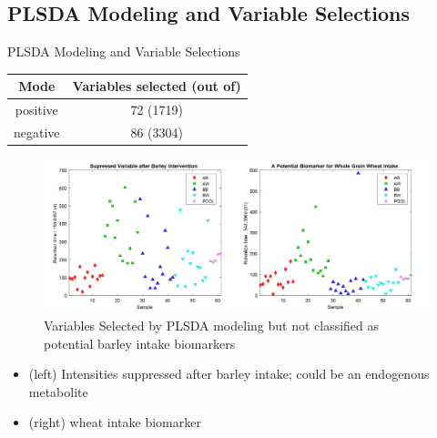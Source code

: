 \documentclass{beamer}
\begin{document}
\subsection{PLSDA Modeling and Variable Selections}
\begin{frame}{PLSDA Modeling and Variable Selections}

\begin{table}
\centering
\begin{tabular}{c|c}
Mode & Variables selected (out of) \\\hline
positive & 72 (1719) \\
negative & 86 (3304)
\end{tabular}
\end{table}

\begin{figure}[h]
    \centering
    \includegraphics[scale=0.25]{images/marker1.png}
    \caption{Variables Selected by PLSDA modeling but not classified as potential barley intake biomarkers}
    \label{fig:marker1}
\end{figure}
\begin{itemize}
\item (left) Intensities suppressed after barley intake; could be an endogenous metabolite
\item (right) wheat intake biomarker


\end{itemize}
\end{frame}
\end{document}

